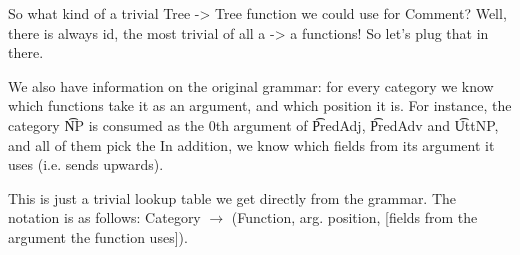 So what kind of a trivial Tree -> Tree function we could use for
Comment? Well, there is always id, the most trivial of all a -> a
functions! So let’s plug that in there.

\begin{EmptyItem}
\begin{Highlighting}[]
    \OtherTok{::=} 
   \OtherTok{::=} \NormalTok{\{ \}}
   \OtherTok{::=} \NormalTok{\{ \}}
  \OtherTok{::=} \NormalTok{\{ \}}
   \OtherTok{::=} \NormalTok{\{ \}}
  \OtherTok{::=} \NormalTok{\{ \}}
 \OtherTok{::=} \NormalTok{\{ \}}
\end{Highlighting}
\end{EmptyItem}

We also have information on the original grammar: for every category
we know which functions take it as an argument, and which position it
is. For instance, the category \t{NP} is consumed as the 0th argument
of \t{PredAdj}, \t{PredAdv} and \t{UttNP}, and all of them pick the
In addition, we know which fields from its argument it uses (i.e. sends upwards).

This is just a trivial lookup table we get directly from the
grammar. The notation is as follows: Category $\rightarrow$ (Function,
arg. position, [fields from the argument the function uses]).

